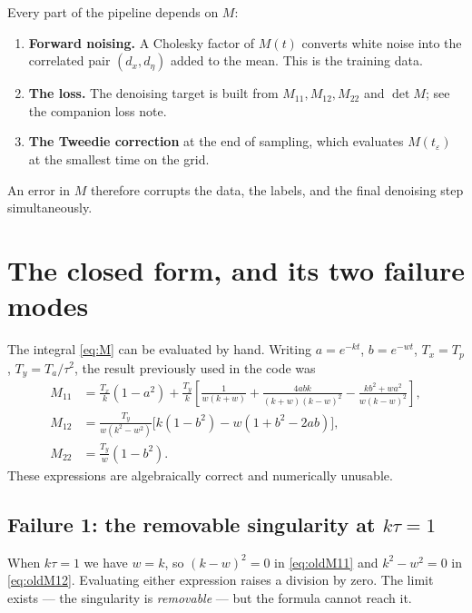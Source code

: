 \documentclass[11pt]{article}
\newcommand{\Tp}{T_p}
\newcommand{\Ta}{T_a}
\newcommand{\kk}{k}
\newcommand{\tauu}{\tau}
\begin{document}
Every part of the pipeline depends on $M$:
\begin{enumerate}\itemsep2pt
\item \textbf{Forward noising.} A Cholesky factor of $M(t)$ converts white noise into the
      correlated pair $(d_x,d_\eta)$ added to the mean. This is the training data.
\item \textbf{The loss.} The denoising target is built from $M_{11},M_{12},M_{22}$ and
      $\det M$; see the companion loss note.
\item \textbf{The Tweedie correction} at the end of sampling, which evaluates
      $M(t_\varepsilon)$ at the smallest time on the grid.
\end{enumerate}
An error in $M$ therefore corrupts the data, the labels, and the final denoising step
simultaneously.

\section{The closed form, and its two failure modes}

The integral \eqref{eq:M} can be evaluated by hand. Writing $a=e^{-\kk t}$, $b=e^{-wt}$,
$T_x=\Tp$, $T_y=\Ta/\tauu^{2}$, the result previously used in the code was
\begin{align}
M_{11} &= \frac{T_x}{\kk}\left(1-a^{2}\right)
        + \frac{T_y}{\kk}\left[
            \frac{1}{w(\kk+w)}
          + \frac{4abk}{(\kk+w)(\kk-w)^{2}}
          - \frac{\kk b^{2}+w a^{2}}{w(\kk-w)^{2}}
          \right], \label{eq:oldM11}\\
M_{12} &= \frac{T_y}{w(\kk^{2}-w^{2})}
          \Big[\kk\left(1-b^{2}\right) - w\left(1+b^{2}-2ab\right)\Big],
          \label{eq:oldM12}\\
M_{22} &= \frac{T_y}{w}\left(1-b^{2}\right). \label{eq:oldM22}
\end{align}
These expressions are algebraically correct and numerically unusable.

\subsection{Failure 1: the removable singularity at $\kk\tauu=1$}

When $\kk\tauu=1$ we have $w=\kk$, so $(\kk-w)^{2}=0$ in \eqref{eq:oldM11} and
$\kk^{2}-w^{2}=0$ in \eqref{eq:oldM12}. Evaluating either expression raises a division by
zero. The limit exists --- the singularity is \emph{removable} --- but the formula cannot
reach it.
\end{document}
